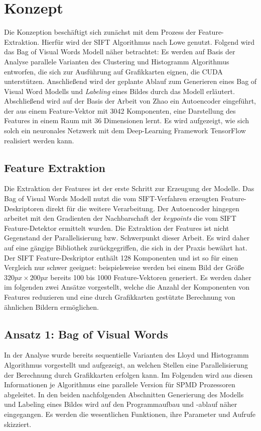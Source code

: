 \chapter{Konzept}

Die Konzeption beschäftigt sich zunächst mit dem Prozess der Feature-Extraktion. Hierfür wird der SIFT Algorithmus nach Lowe genutzt. Folgend wird das Bag of Visual Words Modell näher betrachtet: Es werden auf Basis der Analyse parallele Varianten des Clustering und Histogramm Algorithmus entworfen, die sich zur Ausführung auf Grafikkarten eignen, die CUDA unterstützen. Anschließend wird der geplante Ablauf zum Generieren eines Bag of Visual Word Modells und \textit{Labeling} eines Bildes durch das Modell erläutert.
Abschließend wird auf der Basis der Arbeit von Zhao \cite{aed2016} ein Autoencoder eingeführt, der aus einem Feature-Vektor mit 3042 Komponenten, eine Darstellung des Features in einem Raum mit 36 Dimensionen lernt. Es wird aufgezeigt, wie sich solch ein neuronales Netzwerk mit dem Deep-Learning Framework TensorFlow realisiert werden kann.

\section{Feature Extraktion}

Die Extraktion der Features ist der erste Schritt zur Erzeugung der Modelle. Das Bag of Visual Words Modell nutzt die vom SIFT-Verfahren erzeugten Feature-Deskriptoren direkt für die weitere Verarbeitung. Der Autoencoder hingegen arbeitet mit den Gradienten der Nachbarschaft der \textit{keypoints} die vom SIFT Feature-Detektor ermittelt wurden. Die Extraktion der Features ist nicht Gegenstand der Parallelisierung bzw. Schwerpunkt dieser Arbeit. Es wird daher auf eine gängige Bibliothek zurückgegriffen, die sich in der Praxis bewährt hat. 
Der SIFT Feature-Deskriptor enthält 128 Komponenten und ist so für einen Vergleich nur schwer geeignet: beispielsweise werden bei einem Bild der Größe $320px \times 200px$ bereits 100 bis 1000 Feature-Vektoren generiert. Es werden daher im folgenden zwei Ansätze vorgestellt, welche die Anzahl der Komponenten von Features reduzieren und eine durch Grafikkarten gestützte Berechnung von ähnlichen Bildern ermöglichen.

\section{Ansatz 1: Bag of Visual Words}

In der Analyse wurde bereits sequentielle Varianten des Lloyd und Histogramm Algorithmus vorgestellt und aufgezeigt, an welchen Stellen eine Parallelisierung der Berechnung durch Grafikkarten erfolgen kann. Im Folgenden wird aus diesen Informationen je Algorithmus eine parallele Version für SPMD Prozessoren abgeleitet.
In den beiden nachfolgenden Abschnitten Generierung des Modells und Labeling eines Bildes wird auf den Programmaufbau und -ablauf näher eingegangen. Es werden die wesentlichen Funktionen, ihre Parameter und Aufrufe skizziert.

